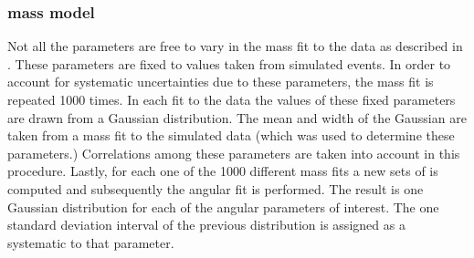 \subsubsection{\mJpsiKpi mass model}
\label{systMassModel}
Not all the \pdf parameters are free to vary in the mass fit to the data as described in .
These parameters are fixed to values taken from simulated events.
In order to account for systematic uncertainties due to these parameters, the mass fit is repeated 1000 times. In each fit
to the data the values of these fixed parameters are drawn from a Gaussian distribution. The mean and width of the Gaussian are
taken from a mass fit to the simulated data (which was used to determine these parameters.)
Correlations among these parameters are taken into account in this procedure. Lastly, for each one of the 1000 different mass fits
a new sets of \sWeights is computed and subsequently the angular fit is performed. The result is one Gaussian distribution
for each of the angular parameters of interest. The one standard deviation interval of the previous distribution is assigned
as a systematic to that parameter.

